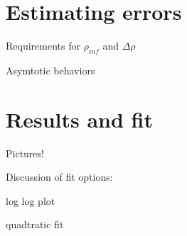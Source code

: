 \documentclass[12pt,twoside]{reedthesis}
\begin{document}
\section{Estimating errors}
Requirements for $\rho_{inf}$ and $\Delta \rho$

Asymtotic behaviors

\section{Results and fit}
Pictures!

Discussion of fit options:

log log plot

quadtratic fit


%
%
%	
%
%
%
%
\backmatter %
%

 
  
%
   \nocite{*}
   

\end{document}
